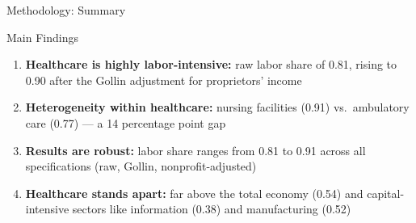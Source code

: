 \begin{frame}{Methodology: Summary}

\begin{alertblock}{Main Findings}
\begin{enumerate}
    \item \textbf{Healthcare is highly labor-intensive:} raw labor share of 0.81, rising to 0.90 after the Gollin adjustment for proprietors' income
    \item \textbf{Heterogeneity within healthcare:} nursing facilities (0.91) vs.\ ambulatory care (0.77) --- a 14 percentage point gap
    \item \textbf{Results are robust:} labor share ranges from 0.81 to 0.91 across all specifications (raw, Gollin, nonprofit-adjusted)
    \item \textbf{Healthcare stands apart:} far above the total economy (0.54) and capital-intensive sectors like information (0.38) and manufacturing (0.52)
\end{enumerate}
\end{alertblock}

\end{frame}
